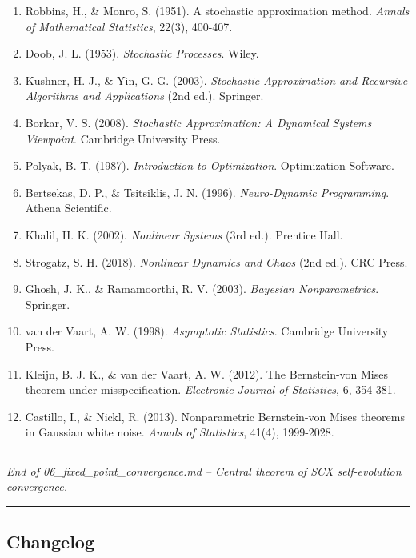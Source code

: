 \documentclass[
  12pt,
]{article}
\providecommand{\tightlist}{%
  \setlength{\itemsep}{0pt}\setlength{\parskip}{0pt}}
\begin{document}
\begin{enumerate}
\def\labelenumi{\arabic{enumi}.}
\tightlist
\item
  Robbins, H., \& Monro, S. (1951). A stochastic approximation method.
  \emph{Annals of Mathematical Statistics}, 22(3), 400-407.
\item
  Doob, J. L. (1953). \emph{Stochastic Processes}. Wiley.
\item
  Kushner, H. J., \& Yin, G. G. (2003). \emph{Stochastic Approximation
  and Recursive Algorithms and Applications} (2nd ed.). Springer.
\item
  Borkar, V. S. (2008). \emph{Stochastic Approximation: A Dynamical
  Systems Viewpoint}. Cambridge University Press.
\item
  Polyak, B. T. (1987). \emph{Introduction to Optimization}.
  Optimization Software.
\item
  Bertsekas, D. P., \& Tsitsiklis, J. N. (1996). \emph{Neuro-Dynamic
  Programming}. Athena Scientific.
\item
  Khalil, H. K. (2002). \emph{Nonlinear Systems} (3rd ed.). Prentice
  Hall.
\item
  Strogatz, S. H. (2018). \emph{Nonlinear Dynamics and Chaos} (2nd ed.).
  CRC Press.
\item
  Ghosh, J. K., \& Ramamoorthi, R. V. (2003). \emph{Bayesian
  Nonparametrics}. Springer.
\item
  van der Vaart, A. W. (1998). \emph{Asymptotic Statistics}. Cambridge
  University Press.
\item
  Kleijn, B. J. K., \& van der Vaart, A. W. (2012). The Bernstein-von
  Mises theorem under misspecification. \emph{Electronic Journal of
  Statistics}, 6, 354-381.
\item
  Castillo, I., \& Nickl, R. (2013). Nonparametric Bernstein-von Mises
  theorems in Gaussian white noise. \emph{Annals of Statistics}, 41(4),
  1999-2028.
\end{enumerate}

\begin{center}\rule{0.5\linewidth}{0.5pt}\end{center}

\emph{End of 06\_fixed\_point\_convergence.md -- Central theorem of SCX
self-evolution convergence.}

\begin{center}\rule{0.5\linewidth}{0.5pt}\end{center}

\subsection{Changelog}\label{changelog}
\end{document}
